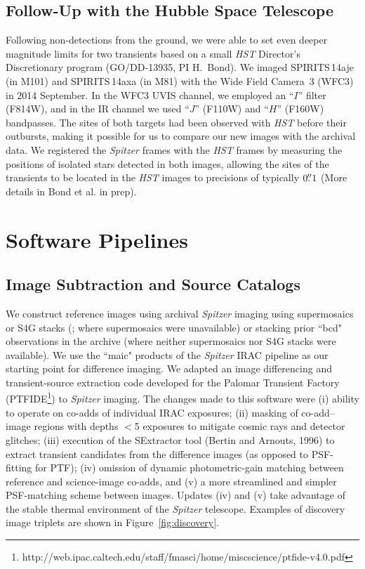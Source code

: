 \documentclass[twocolumn,times]{aastex6}
\newcommand{\HST}{{\it HST}}
\begin{document}
\subsection{Follow-Up with the Hubble Space Telescope}
Following non-detections from the ground, we were able to set even deeper magnitude limits 
for two transients based on a small \HST\/ Director's Discretionary program (GO/DD-13935, PI H.~Bond).
We imaged SPIRITS\,14aje (in M101) and SPIRITS\,14axa (in M81) with the Wide Field Camera~3
(WFC3) in 2014 September. In the WFC3 UVIS channel, we employed an ``$I$''
filter (F814W), and in the IR channel we used ``$J$'' (F110W) and ``$H$''
(F160W) bandpasses. The sites of both targets had been observed with \HST\/ before their outbursts,
making it possible for us to compare our new images with the archival data. We
registered the {\it Spitzer} frames with the \HST\/ frames by measuring the
positions of isolated stars detected in both images, allowing the sites of the
transients to be located in the \HST\/ images to precisions of typically
$0\mbox{$.\!\!^{\prime\prime}$}1$ (More details in Bond et al. in prep).

\section{Software Pipelines}
\label{sec:software}

\subsection{Image Subtraction and Source Catalogs}

We construct reference images using archival {\it Spitzer} imaging using
supermosaics  or S4G stacks (\citealt{Sheth2010}; where supermosaics were unavailable) or
stacking prior ``bcd" observations in the archive  (where neither supermosaics nor S4G  stacks were available).
We use the ``maic" products of the {\it Spitzer} IRAC pipeline as our starting point for difference imaging. 
We adapted an image differencing and transient-source extraction code developed for the Palomar Transient Factory (PTFIDE\footnote{http://web.ipac.caltech.edu/staff/fmasci/home/miscscience/ptfide-v4.0.pdf}) to {\it Spitzer} imaging. The changes made to this software were (i) ability to operate on co-adds of individual IRAC exposures; (ii) masking of co-add--image regions with depths $<$5 exposures to mitigate cosmic rays and detector glitches; (iii) execution of the SExtractor tool (Bertin and Arnouts, 1996) to extract transient candidates from the difference images (as opposed to PSF-fitting for PTF); (iv) omission of dynamic photometric-gain matching between reference and science-image co-adds, and (v) a more streamlined and simpler PSF-matching scheme between images. Updates (iv) and (v) take advantage of the stable thermal environment of the {\it Spitzer} telescope. Examples of discovery image triplets are shown in Figure~\ref{fig:discovery}.
\end{document}
